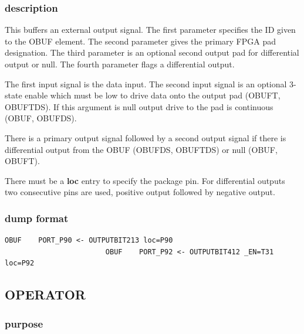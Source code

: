 \documentclass[10pt,a4paper,twoside,fleqn]{book}
\begin{document}
                \subsubsection{description}

                    This buffers an external output signal. The first parameter
                    specifies the ID given to the OBUF element. The second
                    parameter gives the primary FPGA pad designation. The third
                    parameter is an optional second output pad for differential
                    output or null. The fourth parameter flags a differential
                    output.

                    The first input signal is the data input. The second input
                    signal is an optional 3-state enable which must be low to
                    drive data onto the output pad (OBUFT, OBUFTDS). If this
                    argument is null output drive to the pad is continuous (OBUF,
                    OBUFDS).

                    There is a primary output signal followed by a second output
                    signal if there is differential output from the OBUF (OBUFDS,
                    OBUFTDS) or null (OBUF, OBUFT).

                    There must be a {\bf loc} entry to specify the package pin.
                    For differential outputs two consecutive pins are used,
                    positive output followed by negative output.
                    

                \subsubsection{dump format}

                    \begin{lstlisting}[gobble=20, language=tde]
                        OBUF    PORT_P90 <- OUTPUTBIT213 loc=P90
                        OBUF    PORT_P92 <- OUTPUTBIT412 _EN=T31 loc=P92
                    \end{lstlisting}


            \subsection{OPERATOR}

                \subsubsection{purpose}
\end{document}
